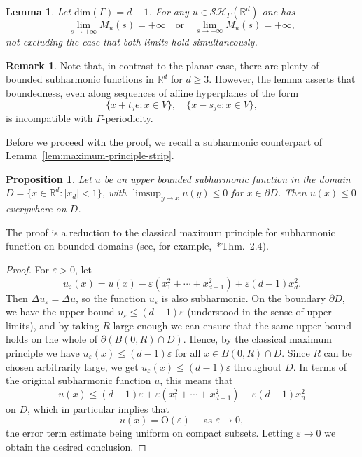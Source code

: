 \documentclass[12pt]{paper}
\numberwithin{equation}{section}
\theoremstyle{plain}
\newtheorem{lemma}[theorem]{Lemma}
\newtheorem{proposition}[theorem]{Proposition}
\theoremstyle{definition}
\newtheorem{remark}[theorem]{Remark}
\newcommand{\Rd}{\mathbb{R}^{d}}
\newcommand{\sharm}[2][]{\mathcal{SH}_{#1}(#2)}
\renewcommand{\epsilon}{\varepsilon}
\begin{document}
\begin{lemma}\label{lem:G-inv-SH-growth}
  Let \(\mathrm{dim}(\Gamma)=d-1\). For any \(u\in \sharm[\Gamma]{\Rd}\) one has
  \begin{equation}
    \label{eq:growth-G-inv-f}
    \lim_{s\to+\infty} M_{u}(s)=+\infty\quad\text{or}
    \quad \lim_{s\to-\infty} M_{u}(s)=+\infty,
  \end{equation}
  not excluding the case that both limits hold simultaneously.
\end{lemma}

\begin{remark}
  Note that, in contrast to the planar case, there are plenty of bounded subharmonic functions in
  \(\Rd\) for \(d\ge 3\).  However, the lemma asserts that boundedness, even along
  sequences of affine hyperplanes of the form \[\{x + t_j e: x\in V\}, \quad \{x- s_j e: x\in V\},\]
  is incompatible with \(\Gamma\)-periodicity.
\end{remark}

Before we proceed with the proof, we recall a subharmonic counterpart of
Lemma~\ref{lem:maximum-principle-strip}.
\begin{proposition}\label{prop:Lindelof}
  Let \(u\) be an upper bounded subharmonic function in the domain
  \(D = \{x \in \Rd : |x_d| < 1 \}\), with \(\limsup_{y\to x}u(y)\le 0\) for \(x\in \partial D\).
  Then \(u(x)\le 0\) everywhere on \(D\).
\end{proposition}

\noindent The proof is a reduction to the classical maximum principle for subharmonic function on
bounded domains (see, for example,~\cite{haymanSubharmonicFunctionsVol1976}*{Thm.~2.4}).

\begin{proof}
  For \(\epsilon>0\), let
  \[
    u_\epsilon(x)=u(x)-\epsilon\left(x_1^2+\cdots+x_{d-1}^2\right) +\epsilon(d-1)x_d^2.
  \]
  Then \(\Delta u_\epsilon=\Delta u\), so the function \(u_\epsilon\) is also subharmonic.  On the
  boundary \(\partial D\), we have the upper bound \(u_\epsilon\le (d-1)\epsilon\) (understood in
  the sense of upper limits), and by taking \(R\) large enough we can ensure that the same upper
  bound holds on the whole of \(\partial (B(0,R)\cap D)\).  Hence, by the classical maximum
  principle we have \(u_\epsilon(x)\le (d-1)\epsilon\) for all \(x\in B(0,R)\cap D\).  Since \(R\)
  can be chosen arbitrarily large, we get \(u_\epsilon(x)\le (d-1)\epsilon\) throughout \(D\).  In
  terms of the original subharmonic function \(u\), this means that
  \[
    u(x)\le (d-1)\epsilon +\epsilon\left(x_1^2+\cdots+x_{d-1}^2\right) -\epsilon(d-1)x_n^2
  \]
  on \(D\), which in particular implies that
  \[
    u(x)=\mathrm{O}(\epsilon) \quad\text{ as }\epsilon\to 0,
  \]
  the error term estimate being uniform on compact subsets.  Letting \(\epsilon\to 0\) we obtain the
  desired conclusion.
\end{proof}
\end{document}
